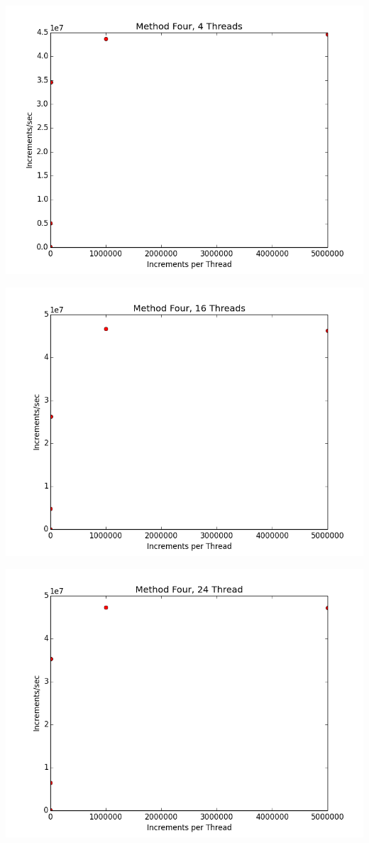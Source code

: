 \documentclass[12pt]{article}
\begin{document}
\includegraphics[scale=.5]{Graphs/MethodFour_4Thread.png}

\includegraphics[scale=.5]{Graphs/MethodFour_16Thread.png}

\includegraphics[scale=.5]{Graphs/MethodFour_24Thread.png}
\end{document}
